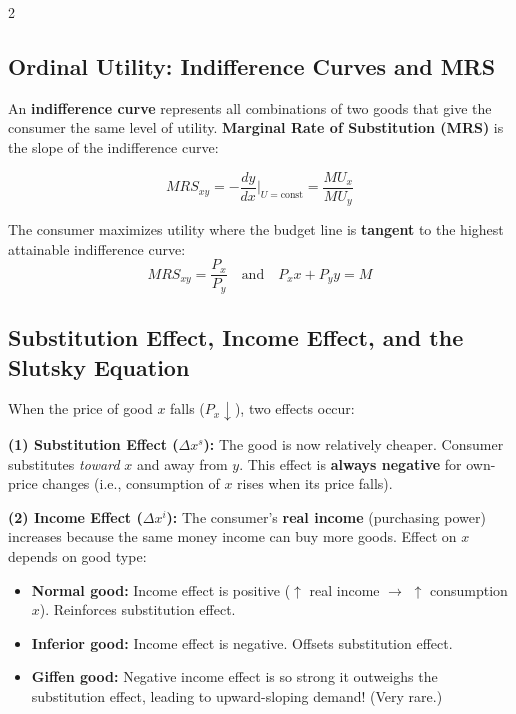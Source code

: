 \documentclass[10pt,a4paper]{article}
\begin{document}
\begin{multicols}{2}
\subsection*{Ordinal Utility: Indifference Curves and MRS}

An \textbf{indifference curve} represents all combinations of two goods that give the consumer the same level of utility. \textbf{Marginal Rate of Substitution (MRS)} is the slope of the indifference curve:

\[
MRS_{xy} = -\frac{dy}{dx}\bigg|_{U=\text{const}} = \frac{MU_x}{MU_y}
\]

The consumer maximizes utility where the budget line is \textbf{tangent} to the highest attainable indifference curve:
\[
MRS_{xy} = \frac{P_x}{P_y} \quad \text{and} \quad P_x x + P_y y = M
\]

\subsection*{Substitution Effect, Income Effect, and the Slutsky Equation}

When the price of good $x$ falls ($P_x \downarrow$), two effects occur:

\textbf{(1) Substitution Effect ($\Delta x^s$):} The good is now relatively cheaper. Consumer substitutes \textit{toward} $x$ and away from $y$. This effect is \textbf{always negative} for own-price changes (i.e., consumption of $x$ rises when its price falls).

\textbf{(2) Income Effect ($\Delta x^i$):} The consumer's \textbf{real income} (purchasing power) increases because the same money income can buy more goods. Effect on $x$ depends on good type:
\begin{itemize}[nosep]
    \item \textbf{Normal good:} Income effect is positive ($\uparrow$ real income $\to$ $\uparrow$ consumption $x$). Reinforces substitution effect.
    \item \textbf{Inferior good:} Income effect is negative. Offsets substitution effect.
    \item \textbf{Giffen good:} Negative income effect is so strong it outweighs the substitution effect, leading to upward-sloping demand! (Very rare.)
\end{itemize}


\end{multicols}
\end{document}
